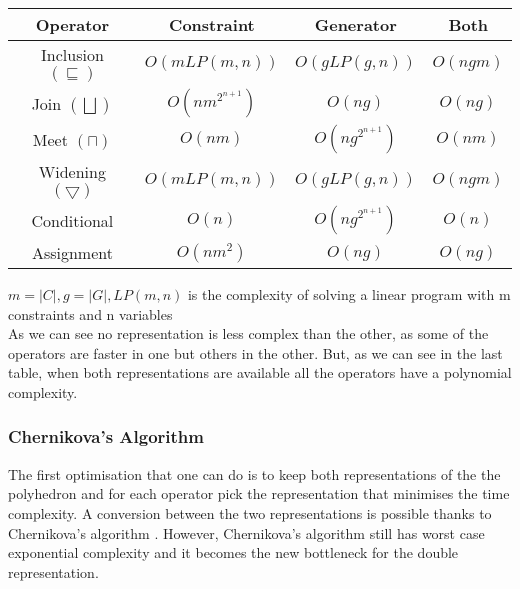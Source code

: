 \begin{center}
\begin{tabular}{||c c c c||} 
 
 \hline
 Operator & Constraint & Generator & Both \\ [0.5ex] 
 \hline
 Inclusion $(\sqsubseteq)$ & $O(mLP(m,n))$ & $O(gLP(g,n))$ & $O(ngm)$ \\ 
 \hline
 Join $(\bigsqcup)$ & $O(nm^{2^{n+1}})$ & $O(ng)$ & $O(ng)$ \\
 \hline
 Meet $(\sqcap)$ & $O(nm)$ & $O(ng^{2^{n+1}})$ & $O(nm)$\\
 \hline
 Widening $(\bigtriangledown)$ & $O(mLP(m,n))$ & $O(gLP(g,n))$ & $O(ngm)$ \\
 \hline
 Conditional & $O(n)$ & $O(ng^{2^{n+1}})$ & $O(n)$ \\ 
 \hline
 Assignment & $O(nm^2)$ & $O(ng)$ & $O(ng)$ \\ 
 
 
 \hline
\end{tabular}
\end{center}
$m=|C|,g=|G|,LP(m,n)$ is the complexity of solving a linear program with m constraints and n variables\\
As we can see no representation is less complex than the other, as some of the operators are faster in one but others in the other. But, as we can see in the last table, when both representations are available all the operators have a polynomial complexity.\\
\subsubsection{Chernikova's Algorithm}
 The first optimisation that one can do is to keep both representations of the the polyhedron and for each operator pick the representation that minimises the time complexity. A conversion between the two representations is possible thanks to Chernikova's algorithm \cite{chernikova1968algorithm}. However, Chernikova's algorithm still has worst case exponential complexity and it becomes the new bottleneck for the double representation.
 
